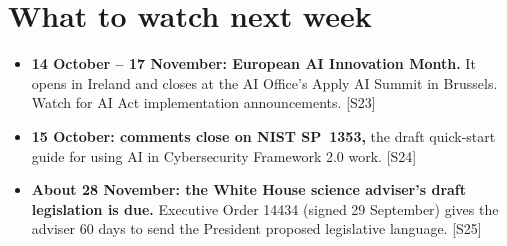 \documentclass[11pt,a4paper]{article}
\newcommand{\srcref}[1]{\textcolor{brandaccent}{[S#1]}}
\begin{document}
\section{What to watch next week}

\begin{itemize}
  \item \textbf{14 October -- 17 November: European AI Innovation Month.} It opens in Ireland and closes at
  the AI Office's Apply AI Summit in Brussels. Watch for AI Act implementation announcements. \srcref{23}
  \item \textbf{15 October: comments close on NIST SP~1353,} the draft quick-start guide for using AI in
  Cybersecurity Framework 2.0 work. \srcref{24}
  \item \textbf{About 28 November: the White House science adviser's draft legislation is due.} Executive Order 14434 (signed 29 September)
  gives the adviser 60 days to send the President proposed legislative language. \srcref{25}
\end{itemize}

\clearpage
\end{document}
